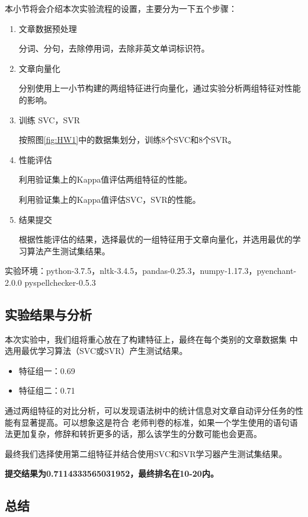 \documentclass[UTF8]{article}
\begin{document}
本小节将会介绍本次实验流程的设置，主要分为一下五个步骤：
\begin{enumerate}
    \item 文章数据预处理

    分词、分句，去除停用词，去除非英文单词标识符。
    \item 文章向量化
    
    分别使用上一小节构建的两组特征进行向量化，通过实验分析两组特征对性能的影响。
    \item 训练 SVC，SVR
    
    按照图\ref{fig:HW1}中的数据集划分，训练8个SVC和8个SVR。
    \item 性能评估
    
    利用验证集上的Kappa值评估两组特征的性能。

    利用验证集上的Kappa值评估SVC，SVR的性能。
    \item 结果提交
    
    根据性能评估的结果，选择最优的一组特征用于文章向量化，并选用最优的学习算法产生测试集结果。
\end{enumerate}

实验环境：python-3.7.5，nltk-3.4.5，pandas-0.25.3，numpy-1.17.3，pyenchant-2.0.0 pyspellchecker-0.5.3

\subsection{实验结果与分析}

本次实验中，我们组将重心放在了构建特征上，最终在每个类别的文章数据集
中选用最优学习算法（SVC或SVR）产生测试结果。

\begin{itemize}
    \item 特征组一：0.69
    \item 特征组二：0.71
\end{itemize}

通过两组特征的对比分析，可以发现语法树中的统计信息对文章自动评分任务的性能有显著提高。可以想象这是符合
老师判卷的标准，如果一个学生使用的语句语法更加复杂，修辞和转折更多的话，那么该学生的分数可能也会更高。

最终我们选择使用第二组特征并结合使用SVC和SVR学习器产生测试集结果。

\textbf{提交结果为0.7114333565031952，最终排名在10-20内。}

\subsection{总结}
\end{document}
